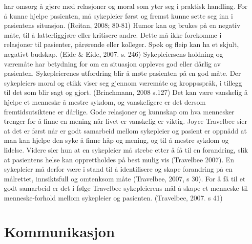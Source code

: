 har omsorg å gjøre med relasjoner og moral som yter seg i praktisk handling.
For å kunne hjelpe pasienten, må sykepleier først og fremst kunne sette seg inn
i pasientens situasjon. (Reitan, 2008; 80-81) Humor kan og brukes på en negativ
måte, til å latterliggjøre eller kritisere andre. Dette må ikke forekomme i
relasjoner til pasienter, pårørende eller kolleger. Spøk og fleip kan ha et
skjult, negativt budskap. (Eide \&{} Eide, 2007. s. 246) Sykepleiersens holdning
og væremåte har betydning for om en situasjon oppleves god eller dårlig av
pasienten. Sykepleierenes utfordring blir å møte pasienten på en god måte. Der
sykepleiers moral og etikk viser seg gjennom væremåte og kroppsspråk, i tillegg
til det som blir sagt og gjort. (Brinchmann, 2008 s.127) Det kan være vanskelig
å hjelpe et menneske å mestre sykdom, og vanskeligere er det dersom
fremtidsutsiktene er dårlige. Gode relasjoner og kunnskap om hva mennesker
trenger for å finne en mening når livet er vanskelig er viktig. Joyce Travelbee
sier at det er først når er godt samarbeid mellom sykepleier og pasient er
oppnådd at man kan hjelpe den syke å finne håp og mening, og til å mestre
sykdom og lidelse.  Videre sier hun at en sykepleier må strebe etter å få til
en forandring, slik at pasientens helse kan opprettholdes på best mulig vis
(Travelbee 2007). En sykepleier må derfor være i stand til å identifisere og
skape forandring på en målrettet, innsiktsfull og omtenksom måte (Travelbee,
2007, s 30). For å få til et godt samarbeid er det i følge Travelbee
sykepleierens mål å skape et menneske-til menneske-forhold mellom sykepleier og
pasienten. (Travelbee, 2007. s 41)

\section{Kommunikasjon}

